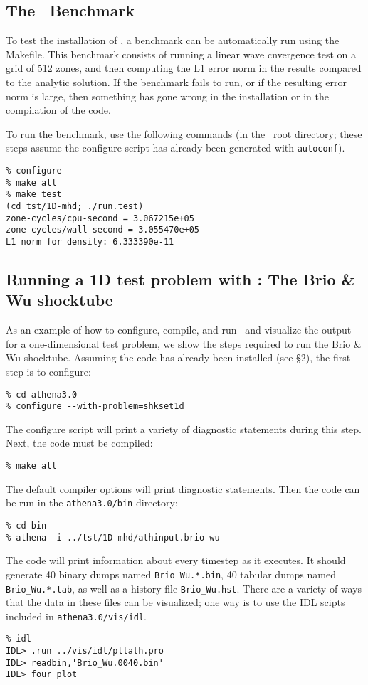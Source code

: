 \subsection{The \ath\ Benchmark}

To test the installation of \ath, a benchmark can be automatically
run using the Makefile.  This benchmark consists of running a linear
wave cnvergence test
on a grid of 512 zones, and
then computing the L1 error norm in the results compared to the
analytic solution.
If the benchmark fails
to run, or if the resulting error norm is large, then something has
gone wrong in the installation or in the compilation of the code.

To run the benchmark, use the following commands (in the \ath\
root directory; these steps assume the configure script has already been generated with {\tt autoconf}).
\begin{verbatim}
% configure
% make all
% make test
(cd tst/1D-mhd; ./run.test)
zone-cycles/cpu-second = 3.067215e+05
zone-cycles/wall-second = 3.055470e+05
L1 norm for density: 6.333390e-11
\end{verbatim}

\subsection{Running a 1D test problem with \ath: The Brio \& Wu shocktube}

As an example of how to configure, compile, and run \ath\ and visualize
the output for a one-dimensional test problem, we show the steps required 
to run the Brio \& Wu shocktube.
Assuming the code has already been installed (see \S2), the first step is
to configure:
\begin{verbatim}
% cd athena3.0
% configure --with-problem=shkset1d
\end{verbatim}
The configure script will print a variety of diagnostic statements during
this step.  Next, the code must be compiled:
\begin{verbatim}
% make all
\end{verbatim}
The default compiler options will print diagnostic statements.  Then
the code can be run in the {\tt athena3.0/bin} directory:
\begin{verbatim}
% cd bin
% athena -i ../tst/1D-mhd/athinput.brio-wu
\end{verbatim}
The code will print information about every timestep as it executes.  It
should generate 40 binary dumps named {\tt Brio\_Wu.*.bin}, 40 tabular
dumps named {\tt Brio\_Wu.*.tab},
as well as a history file {\tt Brio\_Wu.hst}.  There
are a variety of ways that the data in these files can be visualized; one
way is to use the IDL scipts included in {\tt athena3.0/vis/idl}.
\begin{verbatim}
% idl
IDL> .run ../vis/idl/pltath.pro
IDL> readbin,'Brio_Wu.0040.bin'
IDL> four_plot
\end{verbatim}


